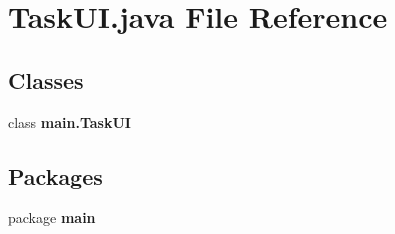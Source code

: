 \section{Task\+U\+I.\+java File Reference}
\label{_task_u_i_8java}
\subsection*{Classes}
\begin{DoxyCompactItemize}
\item 
class \textbf{ main.\+Task\+UI}
\end{DoxyCompactItemize}
\subsection*{Packages}
\begin{DoxyCompactItemize}
\item 
package \textbf{ main}
\end{DoxyCompactItemize}
